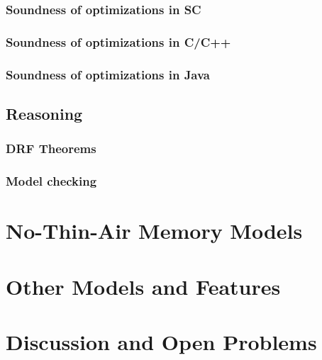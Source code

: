 \documentclass[a4paper,twoside,11pt]{article}
\numberwithin{equation}{section}
\begin{document}
\subsubsection{Soundness of optimizations in SC}

\subsubsection{Soundness of optimizations in C/C++}

\subsubsection{Soundness of optimizations in Java}

\subsection{Reasoning}

\subsubsection{DRF Theorems}

\subsubsection{Model checking}

\section{No-Thin-Air Memory Models}

\section{Other Models and Features}



\section{Discussion and Open Problems}

 

\end{document}
